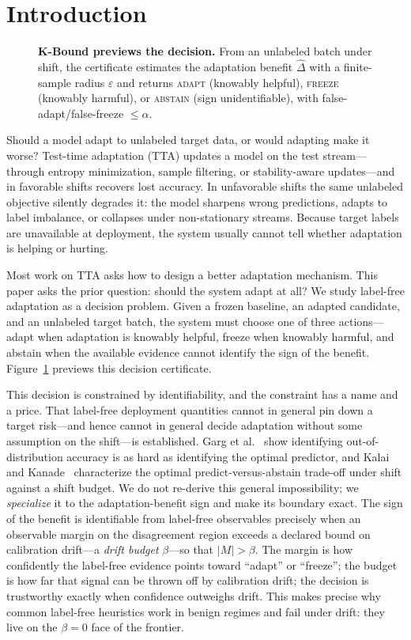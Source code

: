 \documentclass[conference]{IEEEtran}
\theoremstyle{plain}
\theoremstyle{definition}
\begin{document}
\section{Introduction}\label{sec:intro}
\begin{figure}[t]\centering
{}
\caption{\textbf{K-Bound previews the decision.} From an unlabeled batch under shift, the certificate
estimates the adaptation benefit $\widehat\Delta$ with a finite-sample radius $\varepsilon$ and returns
\textsc{adapt} (knowably helpful), \textsc{freeze} (knowably harmful), or \textsc{abstain} (sign
unidentifiable), with false-adapt/false-freeze $\le\alpha$.}
\label{fig:teaser}
\end{figure}
Should a model adapt to unlabeled target data, or would adapting make it worse?
Test-time adaptation (TTA) updates a model on the test stream---through entropy
minimization, sample filtering, or stability-aware updates---and in favorable
shifts recovers lost accuracy. In unfavorable shifts the same unlabeled objective
silently degrades it: the model sharpens wrong predictions, adapts to label
imbalance, or collapses under non-stationary streams. Because target labels are
unavailable at deployment, the system usually cannot tell whether adaptation is
helping or hurting.

Most work on TTA asks how to design a better adaptation mechanism. This paper asks
the prior question: should the system adapt at all? We study label-free adaptation
as a decision problem. Given a frozen baseline, an adapted candidate, and an
unlabeled target batch, the system must choose one of three actions---adapt when
adaptation is knowably helpful, freeze when knowably harmful, and abstain when the
available evidence cannot identify the sign of the benefit. Figure~\ref{fig:teaser}
previews this decision certificate.

This decision is constrained by identifiability, and the constraint has a name and a price. That
label-free deployment quantities cannot in general pin down a target risk---and hence cannot in
general decide adaptation without some assumption on the shift---is established. Garg et
al.~\cite{garg2022atc} show identifying out-of-distribution accuracy is as hard as identifying the
optimal predictor, and Kalai and Kanade~\cite{kalai2021abstain} characterize the optimal
predict-versus-abstain trade-off under shift against a shift budget. We do not re-derive this
general impossibility; we \emph{specialize} it to the adaptation-benefit sign and make its boundary
exact. The sign of the benefit is identifiable from label-free observables precisely when an
observable margin on the disagreement region exceeds a declared bound on calibration
drift---a \emph{drift budget} $\beta$---so that $|M|>\beta$. The margin is how confidently the
label-free evidence points toward ``adapt'' or ``freeze''; the budget is how far that signal can be
thrown off by calibration drift; the decision is trustworthy exactly when confidence outweighs
drift. This makes precise why common label-free heuristics work in benign regimes and fail under
drift: they live on the $\beta{=}0$ face of the frontier.
\end{document}

